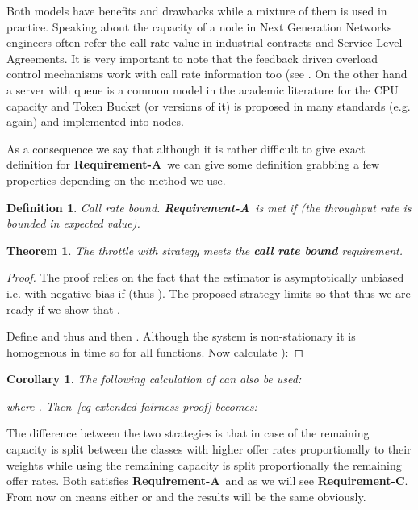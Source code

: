 \documentclass[conference]{IEEEtran}
\newtheorem{theorem}{Theorem}
\newtheorem{corollary}{Corollary}
\newtheorem{definition}{Definition}
\newcommand{\reqA}{\textbf{Requirement-A}}
\newcommand{\reqC}{\textbf{Requirement-C}}
\begin{document}
Both models have benefits and drawbacks while a mixture of them is
used in practice. Speaking about the capacity of a node in Next
Generation Networks engineers often refer the call rate value in
industrial contracts and Service Level Agreements. It is very
important to note that the feedback driven overload control
mechanisms work with call rate information too (see \cite{H.248.11}.
On the other hand a server with queue is a common model in the
academic literature for the CPU capacity and Token Bucket (or
versions of it) is proposed in many standards (e.g. \cite{H.248.11}
again) and implemented into nodes.

As a consequence we say that although it is rather difficult to give
exact definition for \reqA\ we can give some definition grabbing a
few properties depending on the method we use.

\begin{definition} Call rate bound. \reqA\ is met if  (the throughput rate is bounded in expected
value).
\end{definition}

\begin{theorem}\label{thm-gammaG-maxbound}
The throttle with strategy  meets the \textbf{call rate
bound} requirement.
\end{theorem}

\begin{proof} The proof relies on the fact that the estimator is asymptotically unbiased i.e.  with negative bias if  (thus
). The proposed strategy  limits
 so that  thus we are ready if we show that
.

Define 
and  thus
 and then . Although the
system is non-stationary it is homogenous in time so
 for all functions. Now calculate ):


\end{proof}

\begin{corollary} The following calculation of  can also be used:

where .
Then~\eqref{eq-extended-fairness-proof} becomes:

\end{corollary}

The difference between the two strategies is that in case of  the
remaining capacity is split between the classes with higher offer
rates proportionally to their weights while using  the remaining
capacity is split proportionally the remaining offer rates. Both
satisfies \reqA\ and as we will see \reqC. From now on  means
either  or  and the results will be the same obviously.
\end{document}
